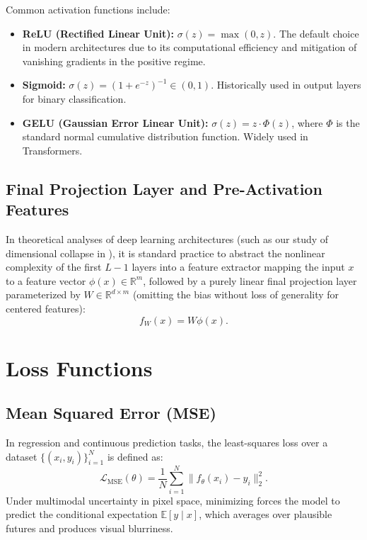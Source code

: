 \documentclass[11pt, oneside, openany]{book}
\begin{document}
Common activation functions include:
\begin{itemize}
    \item \textbf{ReLU (Rectified Linear Unit):} $\sigma(z) = \max(0, z)$. The default choice in modern architectures due to its computational efficiency and mitigation of vanishing gradients in the positive regime.
    \item \textbf{Sigmoid:} $\sigma(z) = (1 + e^{-z})^{-1} \in (0, 1)$. Historically used in output layers for binary classification.
    \item \textbf{GELU (Gaussian Error Linear Unit):} $\sigma(z) = z \cdot \Phi(z)$, where $\Phi$ is the standard normal cumulative distribution function. Widely used in Transformers.
\end{itemize}

\subsection{Final Projection Layer and Pre-Activation Features}
\label{sec:A.1.1}

In theoretical analyses of deep learning architectures (such as our study of dimensional collapse in ), it is standard practice to abstract the nonlinear complexity of the first $L-1$ layers into a feature extractor mapping the input $x$ to a feature vector $\phi(x) \in \mathbb{R}^{m}$, followed by a purely linear final projection layer parameterized by $W \in \mathbb{R}^{d \times m}$ (omitting the bias without loss of generality for centered features):
\begin{equation}
\label{eq:A.2}
f_{W}(x) = W \phi(x).
\end{equation}

\section{Loss Functions}
\label{sec:A.2}

\subsection{Mean Squared Error (MSE)}
\label{sec:A.2.1}

In regression and continuous prediction tasks, the least-squares loss over a dataset $\{(x_{i}, y_{i})\}_{i=1}^{N}$ is defined as:
\begin{equation}
\label{eq:A.3}
\mathcal{L}_{\text{MSE}}(\theta) = \frac{1}{N} \sum_{i=1}^{N} \lVert f_{\theta}(x_{i}) - y_{i} \rVert_{2}^{2}.
\end{equation}
Under multimodal uncertainty in pixel space, minimizing  forces the model to predict the conditional expectation $\mathbb{E}[y \mid x]$, which averages over plausible futures and produces visual blurriness.
\end{document}
